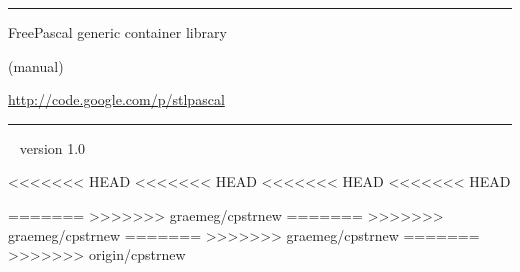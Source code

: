 \documentclass[a4paper]{report}
\begin{document}
\thispagestyle{empty}
\vfill
\vfill
\begin{center}
\begin{minipage}{0.8\textwidth}
\hrule
\bigskip\bigskip
\centerline{\LARGE\sc FreePascal generic container library}
\smallskip
\centerline{(manual)}
\smallskip
\centerline{\url{http://code.google.com/p/stlpascal}}
\bigskip
\bigskip
\bigskip\bigskip
\hrule
\end{minipage}
\end{center}
\vfill
{~}
\hfill version 1.0
\eject %

\tableofcontents










<<<<<<< HEAD
<<<<<<< HEAD
<<<<<<< HEAD
<<<<<<< HEAD


=======
>>>>>>> graemeg/cpstrnew
=======
>>>>>>> graemeg/cpstrnew
=======
>>>>>>> graemeg/cpstrnew
=======
>>>>>>> origin/cpstrnew
\end{document}
